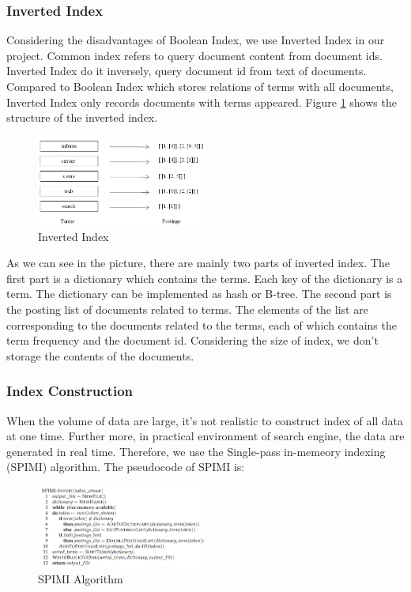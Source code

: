 \documentclass[10pt,journal,compsoc]{IEEEtran}
\begin{document}
\subsubsection{Inverted Index}
Considering the disadvantages of Boolean Index, we use Inverted Index in our project. Common index refers to query document content from document ids. Inverted Index do it inversely, query document id from text of documents. Compared to Boolean Index which stores relations of terms with all documents, Inverted Index\cite{harman1992inverted} only records documents with terms appeared. Figure \ref{fig:index} shows the structure of the inverted index.
\begin{figure}[H]
  \centering
    \includegraphics[width=0.5\textwidth]{images/inverted_index.png}
    \caption{Inverted Index}
    \label{fig:index}
\end{figure}
As we can see in the picture, there are mainly two parts of inverted index. The first part is a dictionary which contains the terms. Each key of the dictionary is a term. The dictionary can be implemented as hash or B-tree. The second part is the posting list of documents related to terms. The elements of the list are corresponding to the documents related to the terms, each of which contains the term frequency and the document id. Considering the size of index, we don't storage the contents of the documents. 

\subsubsection{Index Construction}
When the volume of data are large, it's not realistic to construct index of all data at one time. Further more, in practical environment of search engine, the data are generated in real time. Therefore, we use the Single-pass in-memeory indexing (SPIMI) algorithm. The pseudocode of SPIMI is:
\begin{figure}[H]
  \centering
    \includegraphics[width=0.5\textwidth]{images/SPIMI-algo.png}
    \caption{SPIMI Algorithm}
    \label{fig:spimi}
\end{figure}
\end{document}
